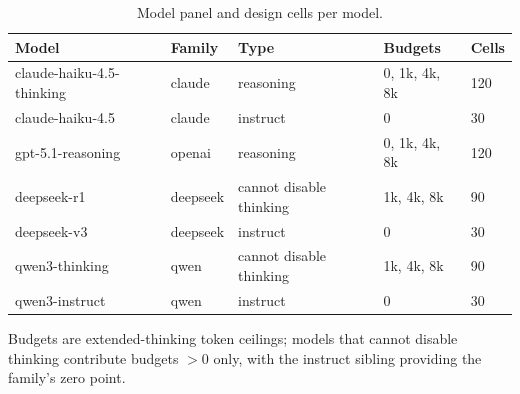 \begin{table}[t]
\centering
\caption{Model panel and design cells per model.}
\label{tab:design}
\small
\begin{tabular}{lllll}
\hline
Model & Family & Type & Budgets & Cells \\
\hline
claude-haiku-4.5-thinking & claude & reasoning & 0, 1k, 4k, 8k & 120 \\
claude-haiku-4.5 & claude & instruct & 0 & 30 \\
gpt-5.1-reasoning & openai & reasoning & 0, 1k, 4k, 8k & 120 \\
deepseek-r1 & deepseek & cannot disable thinking & 1k, 4k, 8k & 90 \\
deepseek-v3 & deepseek & instruct & 0 & 30 \\
qwen3-thinking & qwen & cannot disable thinking & 1k, 4k, 8k & 90 \\
qwen3-instruct & qwen & instruct & 0 & 30 \\
\hline
\end{tabular}
\par\smallskip\footnotesize Budgets are extended-thinking token ceilings; models that cannot disable thinking contribute budgets $>0$ only, with the instruct sibling providing the family's zero point.
\end{table}
